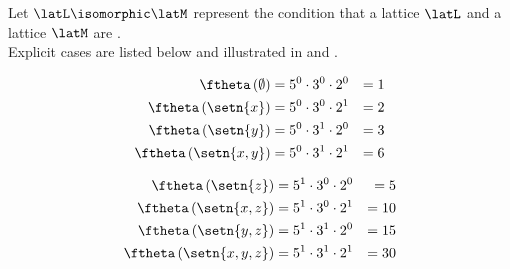 \begin{example}
\label{ex:lat_xyz_235}
Let $\latL\isomorphic\latM$ represent the condition that a lattice $\latL$ and
a lattice $\latM$ are .
\\
Explicit cases are listed below and illustrated in
 and .\\
\hfill
\begin{minipage}{3\tw/8}
\begin{align*}
  \ftheta\left(\emptyset   \right) &= 5^0 \cdot 3^0 \cdot 2^0  &=  1 \\
  \ftheta\left(\setn{x    }\right) &= 5^0 \cdot 3^0 \cdot 2^1  &=  2 \\
  \ftheta\left(\setn{  y  }\right) &= 5^0 \cdot 3^1 \cdot 2^0  &=  3 \\
  \ftheta\left(\setn{x,y  }\right) &= 5^0 \cdot 3^1 \cdot 2^1  &=  6 \\
\end{align*}
\end{minipage}
\hfill
\begin{minipage}{3\tw/8}
\begin{align*}
  \ftheta\left(\setn{    z}\right) &= 5^1 \cdot 3^0 \cdot 2^0  &=  5 \\
  \ftheta\left(\setn{x,  z}\right) &= 5^1 \cdot 3^0 \cdot 2^1  &= 10 \\
  \ftheta\left(\setn{  y,z}\right) &= 5^1 \cdot 3^1 \cdot 2^0  &= 15 \\
  \ftheta\left(\setn{x,y,z}\right) &= 5^1 \cdot 3^1 \cdot 2^1  &= 30 \\
\end{align*}
\end{minipage}
\hfill
\end{example}
